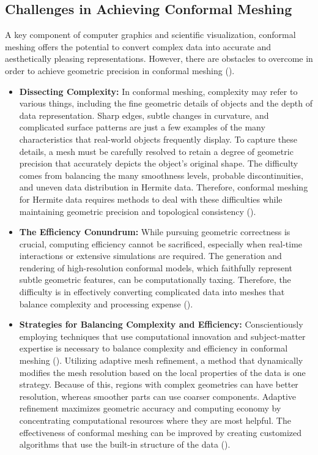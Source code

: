 \subsection{Challenges in Achieving Conformal Meshing}
A key component of computer graphics and scientific visualization, conformal meshing offers the potential to convert complex data into accurate and aesthetically pleasing representations. However, there are obstacles to overcome in order to achieve geometric precision in conformal meshing (\cite{Dai_2007}). 
\begin{itemize}
    \item \textbf{Dissecting Complexity:} In conformal meshing, complexity may refer to various things, including the fine geometric details of objects and the depth of data representation. Sharp edges, subtle changes in curvature, and complicated surface patterns are just a few examples of the many characteristics that real-world objects frequently display. To capture these details, a mesh must be carefully resolved to retain a degree of geometric precision that accurately depicts the object's original shape. The difficulty comes from balancing the many smoothness levels, probable discontinuities, and uneven data distribution in Hermite data. Therefore, conformal meshing for Hermite data requires methods to deal with these difficulties while maintaining geometric precision and topological consistency (\cite{Chen_2022}).
    \item \textbf{The Efficiency Conundrum:} While pursuing geometric correctness is crucial, computing efficiency cannot be sacrificed, especially when real-time interactions or extensive simulations are required. The generation and rendering of high-resolution conformal models, which faithfully represent subtle geometric features, can be computationally taxing. Therefore, the difficulty is in effectively converting complicated data into meshes that balance complexity and processing expense (\cite{Alexa_2009}).
    \item \textbf{Strategies for Balancing Complexity and Efficiency:} Conscientiously employing techniques that use computational innovation and subject-matter expertise is necessary to balance complexity and efficiency in conformal meshing (\cite{Zhang_2012}). Utilizing adaptive mesh refinement, a method that dynamically modifies the mesh resolution based on the local properties of the data is one strategy. Because of this, regions with complex geometries can have better resolution, whereas smoother parts can use coarser components. Adaptive refinement maximizes geometric accuracy and computing economy by concentrating computational resources where they are most helpful. The effectiveness of conformal meshing can be improved by creating customized algorithms that use the built-in structure of the data (\cite{Markiewicz_Koperwas_2021}).
\end{itemize}




